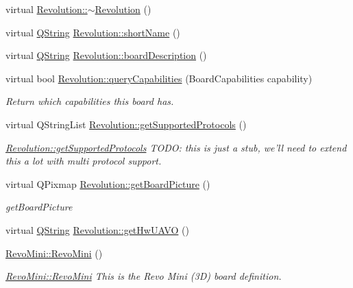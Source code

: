 \begin{DoxyCompactItemize}
virtual \hyperlink{group___boards___open_pilot_plugin_ga231a5a6f79ce02a7e05009982fb65d15}{Revolution\-::$\sim$\-Revolution} ()
\item 
virtual \hyperlink{group___u_a_v_objects_plugin_gab9d252f49c333c94a72f97ce3105a32d}{Q\-String} \hyperlink{group___boards___open_pilot_plugin_gad4cc3e213b15f56ace6281fe55d94f32}{Revolution\-::short\-Name} ()
\item 
virtual \hyperlink{group___u_a_v_objects_plugin_gab9d252f49c333c94a72f97ce3105a32d}{Q\-String} \hyperlink{group___boards___open_pilot_plugin_ga8f2a18257adeeb2cd190e4150cf5cc01}{Revolution\-::board\-Description} ()
\item 
virtual bool \hyperlink{group___boards___open_pilot_plugin_gaef49c9e5a2cbbcbce7b6e7ed3867adaf}{Revolution\-::query\-Capabilities} (Board\-Capabilities capability)
\begin{DoxyCompactList}\small\item\em Return which capabilities this board has. \end{DoxyCompactList}\item 
virtual Q\-String\-List \hyperlink{group___boards___open_pilot_plugin_gaec390e1462c61b4e0d3b433f35159192}{Revolution\-::get\-Supported\-Protocols} ()
\begin{DoxyCompactList}\small\item\em \hyperlink{group___boards___open_pilot_plugin_gaec390e1462c61b4e0d3b433f35159192}{Revolution\-::get\-Supported\-Protocols} T\-O\-D\-O\-: this is just a stub, we'll need to extend this a lot with multi protocol support. \end{DoxyCompactList}\item 
virtual Q\-Pixmap \hyperlink{group___boards___open_pilot_plugin_gae5372488eec83623b6aad34593708034}{Revolution\-::get\-Board\-Picture} ()
\begin{DoxyCompactList}\small\item\em get\-Board\-Picture \end{DoxyCompactList}\item 
virtual \hyperlink{group___u_a_v_objects_plugin_gab9d252f49c333c94a72f97ce3105a32d}{Q\-String} \hyperlink{group___boards___open_pilot_plugin_ga0a6612a8dd453bde6ec037442d18c7c7}{Revolution\-::get\-Hw\-U\-A\-V\-O} ()
\item 
\hyperlink{group___boards___open_pilot_plugin_ga95d3e848c16c6f33a7d1acc14b2773da}{Revo\-Mini\-::\-Revo\-Mini} ()
\begin{DoxyCompactList}\small\item\em \hyperlink{group___boards___open_pilot_plugin_ga95d3e848c16c6f33a7d1acc14b2773da}{Revo\-Mini\-::\-Revo\-Mini} This is the Revo Mini (3\-D) board definition. \end{DoxyCompactList}\item 

\end{DoxyCompactItemize}
